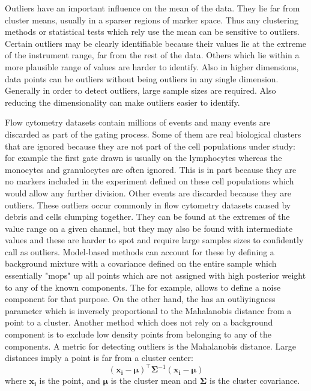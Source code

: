 Outliers have an important influence on the mean of the data.
They lie far from cluster means, usually in a sparser regions of marker space.
Thus any clustering methods or statistical tests which rely use the mean can be sensitive to outliers.
Certain outliers may be clearly identifiable because their values lie at the extreme of the instrument range, far from the rest of the data.
Others which lie within a more plausible range of values are harder to identify.
Also in higher dimensions, data points can be outliers without being outliers in any single dimension.
Generally in order to detect outliers, large sample sizes are required.
Also reducing the dimensionality can make outliers easier to identify.

Flow cytometry datasets contain millions of events and many events are discarded as part of the gating process.
Some of them are real biological clusters that are ignored because they are not part of the cell populations under study:
for example the first gate drawn is usually on the lymphocytes whereas the monocytes and granulocytes are often ignored.
This is in part because they are no markers included in the experiment defined on these cell populations which would allow any further division.
Other events are discarded because they are outliers.
These outliers occur commonly in flow cytometry datasets caused by debris and cells clumping together.
They can be found at the extremes of the value range on a given channel, but they may also be found with intermediate values and these are harder to spot and require large samples sizes to confidently call as outliers.
Model-based methods can account for these by defining a background mixture with a covariance defined on the entire sample which essentially "mops" up all points
which are not assigned with high posterior weight to any of the known components.
The  for example, allows to define a noise component for that purpose.
On the other hand, the  has an outliyingness parameter which is inversely proportional to the Mahalanobis distance from a point to a cluster.
Another method which does not rely on a background component is to exclude low density points from belonging to any of the components.
A metric for detecting outliers is the Mahalanobis distance.  Large distances imply a point is far from a cluster center:
\begin{equation} \label{equation:Mahalanobis}
(\boldsymbol{x_i}-\boldsymbol{\mu})^{\top}\boldsymbol{\Sigma}^{-1}(\boldsymbol{x_i}-\boldsymbol{\mu})
\end{equation}
where $\boldsymbol{x_i}$ is the point, and $\boldsymbol{\mu}$ is the cluster mean and $\boldsymbol{\Sigma}$ is the cluster covariance.

